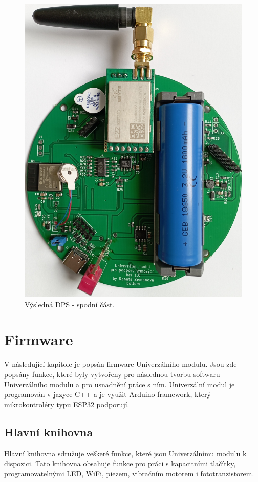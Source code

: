 \begin{figure}[!h]
  \begin{center}
    \includegraphics[scale=0.15]{obrazky/DPS_final_spodni.jpg}
  \end{center}
  \caption[Výsledná DPS - spodní část]{Výsledná DPS - spodní část.}
\end{figure}

\chapter{Firmware}
V následující kapitole je popsán firmware Univerzálního modulu. Jsou zde popsány funkce, které byly vytvořeny pro následnou tvorbu softwaru Univerzálního modulu a pro usnadnění práce s ním. Univerzální 
modul je programován v jazyce C++ a je využit Arduino framework, který mikrokontroléry typu ESP32 podporují.  

\section{Hlavní knihovna}
Hlavní knihovna sdružuje veškeré funkce, které jsou Univerzálnímu modulu k dispozici. Tato knihovna obsahuje funkce pro práci s kapacitními tlačítky, programovatelnými LED, WiFi, piezem, vibračním 
motorem i fototranzistorem. 

